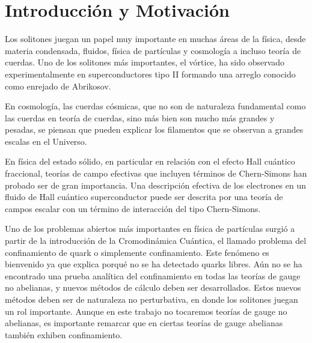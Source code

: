 
\chapter{Introducción y Motivación} %

\label{ch:intro} %

Los solitones juegan un papel muy importante en muchas áreas de la física, desde materia condensada, fluidos, física de partículas y cosmología a incluso teoría de cuerdas. Uno de los solitones más importantes, el vórtice, ha sido observado experimentalmente en superconductores tipo II formando una arreglo conocido como enrejado de Abrikosov.

En cosmología, las cuerdas cósmicas, que no son de naturaleza fundamental como las cuerdas en teoría de cuerdas, sino más bien son mucho más grandes y pesadas, se piensan que pueden explicar los filamentos que se observan a grandes escalas en el Universo.

En física del estado sólido, en particular en relación con el efecto Hall cuántico fraccional, teorías de campo efectivas que incluyen términos de Chern-Simons han probado ser de gran importancia. Una descripción efectiva de los electrones en un fluido de Hall cuántico superconductor puede ser descrita por una teoría de campos escalar con un término de interacción del tipo Chern-Simons.

Uno de los problemas abiertos más importantes en física de partículas surgió a partir de la introducción de la Cromodinámica Cuántica, el llamado problema del confinamiento de quark o simplemente confinamiento. Este fenómeno es bienvenido ya que explica porqué no se ha detectado quarks libres. Aún no se ha encontrado una prueba analítica del confinamiento en todas las teorías de gauge no abelianas, y nuevos métodos de cálculo deben ser desarrollados. Estos nuevos métodos deben ser de naturaleza no perturbativa, en donde los solitones juegan un rol importante. Aunque en este trabajo no tocaremos teorías de gauge no abelianas, es importante remarcar que en ciertas teorías de gauge abelianas también exhiben confinamiento.

